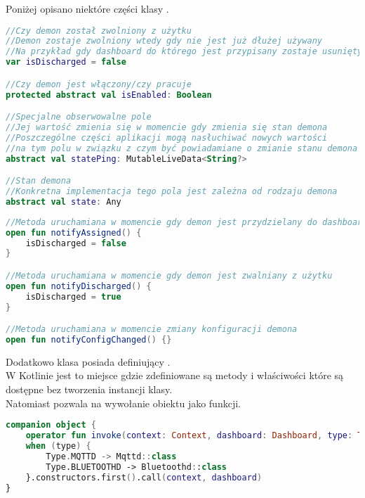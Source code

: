 Poniżej opisano niektóre części klasy .

\begin{lstlisting}[language=Kotlin]
//Czy demon został zwolniony z użytku
//Demon zostaje zwolniony wtedy gdy nie jest już dłużej używany
//Na przykład gdy dashboard do którego jest przypisany zostaje usunięty
var isDischarged = false

//Czy demon jest włączony/czy pracuje
protected abstract val isEnabled: Boolean

//Specjalne obserwowalne pole
//Jej wartość zmienia się w momencie gdy zmienia się stan demona
//Poszczególne części aplikacji mogą nasłuchiwać nowych wartości
//na tym polu w związku z czym być powiadamiane o zmianie stanu demona
abstract val statePing: MutableLiveData<String?>

//Stan demona
//Konkretna implementacja tego pola jest zależna od rodzaju demona
abstract val state: Any
\end{lstlisting}

\newpage

\begin{lstlisting}[language=Kotlin]
//Metoda uruchamiana w momencie gdy demon jest przydzielany do dashboardu
open fun notifyAssigned() {
    isDischarged = false
}

//Metoda uruchamiana w momencie gdy demon jest zwalniany z użytku
open fun notifyDischarged() {
    isDischarged = true
}

//Metoda uruchamiana w momencie zmiany konfiguracji demona
open fun notifyConfigChanged() {}
\end{lstlisting}

\vspace{1em}

Dodatkowo klasa  posiada  definiujący .\\

W Kotlinie  jest to miejsce gdzie zdefiniowane są metody i właściwości które są dostępne bez tworzenia instancji klasy.\\
Natomiast  pozwala na wywołanie obiektu jako funkcji.\\

\begin{lstlisting}[language=Kotlin]
companion object {
    operator fun invoke(context: Context, dashboard: Dashboard, type: Type) =
    when (type) {
        Type.MQTTD -> Mqttd::class
        Type.BLUETOOTHD -> Bluetoothd::class
    }.constructors.first().call(context, dashboard)
}
\end{lstlisting}

